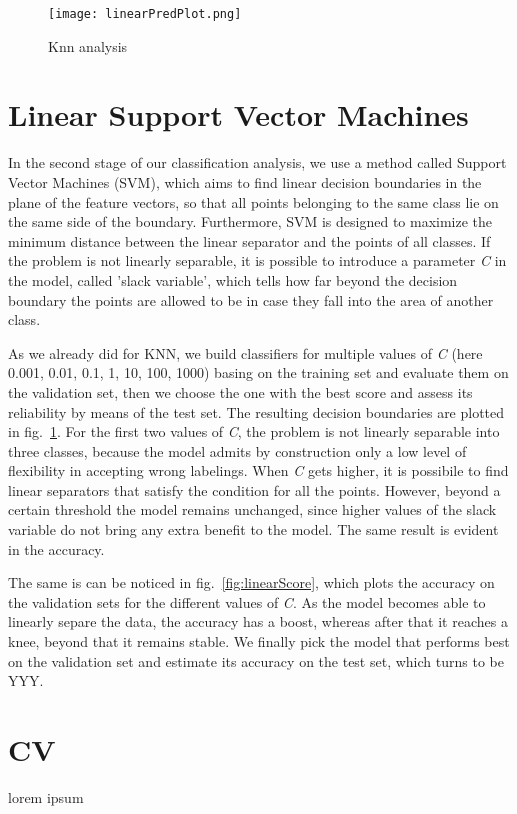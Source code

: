 \documentclass[11pt,twoside,a4paper]{article}
\begin{document}
\begin{figure}[]
  \begin{center}
  \texttt{[image: linearPredPlot.png]}
  \caption{Knn analysis}
  \label{fig:linearPred}
  \end{center}
\end{figure}



\section{Linear Support Vector Machines}
In the second stage of our classification analysis, we use a method called Support Vector Machines (SVM), which aims to find linear decision boundaries in the plane of the feature vectors, so that all points belonging to the same class lie on the same side of the boundary. Furthermore, SVM is designed to maximize the minimum distance between the linear separator and the points of all classes.\newline
If the problem is not linearly separable, it is possible to introduce a parameter \emph{C} in the model, called 'slack variable', which tells how far beyond the decision boundary the points are allowed to be in case they fall into the area of another class.

As we already did for KNN, we build classifiers for multiple values of \emph{C} (here 0.001, 0.01, 0.1, 1, 10, 100, 1000) basing on the training set and evaluate them on the validation set, then we choose the one with the best score and assess its reliability by means of the test set.\newline
The resulting decision boundaries are plotted in fig.~\ref{fig:linearPred}. For the first two values of \emph{C}, the problem is not linearly separable into three classes, because the model admits by construction only a low level of flexibility in accepting wrong labelings. When \emph{C} gets higher, it is possibile to find linear separators that satisfy the condition for all the points. However, beyond a certain threshold the model remains unchanged, since higher values of the slack variable do not bring any extra benefit to the model. The same result is evident in the accuracy.

The same is can be noticed in fig.~\ref{fig:linearScore}, which plots the accuracy on the validation sets for the different values of \emph{C}. As the model becomes able to linearly separe the data, the accuracy has a boost, whereas after that it reaches a knee, beyond that it remains stable. We finally pick the model that performs best on the validation set and estimate its accuracy on the test set, which turns to be YYY.



\section{CV}
\label{CV}
lorem ipsum
\end{document}
